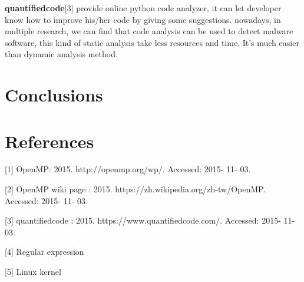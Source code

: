 \documentclass{acm_proc_article-sp}
\begin{document}
	\textbf{quantifiedcode}[3] provide online python code analyzer, it can let developer 
	know how to improve his/her code by giving some suggestions.
	nowadays, in multiple research, we can find that code analysis can be used to 
	detect malware software, this kind of static analysis take less resources and time. 
	It’s much easier than dynamic analysis method.

\section{Conclusions}


\section{References}
[1] OpenMP: 2015. http://openmp.org/wp/. Accessed: 2015- 11- 03.

[2] OpenMP wiki page : 2015. https://zh.wikipedia.org/zh-tw/OpenMP. Accessed: 2015- 11- 03.

[3] quantifiedcode : 2015. https://www.quantifiedcode.com/. Accessed: 2015- 11- 03.

[4] Regular expression

[5] Linux kernel
\end{document}
